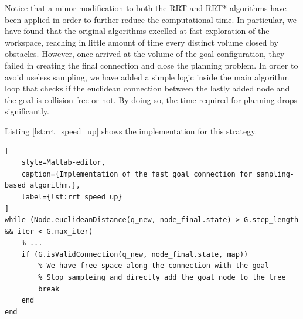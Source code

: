 Notice that a minor modification to both the RRT and RRT* algorithms have been applied in order to further reduce the computational time.
In particular, we have found that the original algorithms excelled at fast exploration of the workspace, reaching in little amount of time every distinct volume closed by obstacles.
However, once arrived at the volume of the goal configuration, they failed in creating the final connection and close the planning problem.
In order to avoid useless sampling, we have added a simple logic inside the main algorithm loop that checks if the euclidean connection between the lastly added node and the goal is collision-free or not.
By doing so, the time required for planning drops significantly.

Listing \ref{lst:rrt_speed_up} shows the implementation for this strategy.

\begin{lstlisting}[
    style=Matlab-editor,
    caption={Implementation of the fast goal connection for sampling-based algorithm.},
    label={lst:rrt_speed_up}
]
while (Node.euclideanDistance(q_new, node_final.state) > G.step_length && iter < G.max_iter)
    % ...
    if (G.isValidConnection(q_new, node_final.state, map))
        % We have free space along the connection with the goal
        % Stop sampleing and directly add the goal node to the tree
        break
    end
end
\end{lstlisting}